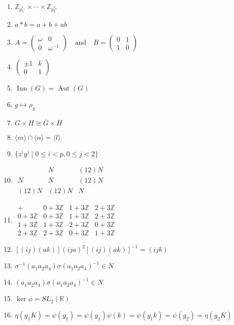 \documentclass[oneside,10pt,]{article}
\newcommand{\inn}{\operatorname{Inn}}
\newcommand{\aut}{\operatorname{Aut}}
\newcommand{\lt}{<}
\begin{document}
\begin{enumerate}
\item{}\({\mathbb Z}_{p_1^{e_1}} \times \cdots \times {\mathbb Z}_{p_k^{e_k}}\)%
\item{}\(a \ast b = a + b + ab\)%
\item{}\(A = \begin{pmatrix} \omega & 0 \\ 0 & \omega^{-1} \end{pmatrix} \quad \text{and} \quad B = \begin{pmatrix} 0 & 1 \\ 1 & 0 \end{pmatrix}\)%
\item{}\(\begin{pmatrix} \pm 1 & k \\ 0 & 1 \end{pmatrix}\)%
\item{}\(\inn(G) = \aut(G)\)%
\item{}\(g \mapsto \rho_g\)%
\item{}\(G \times H \cong \overline{G} \times \overline{H}\)%
\item{}\(\langle m \rangle \cap \langle n \rangle = \langle l \rangle\)%
\item{}\(\{z^iy^j\mid 0\leq i \lt p, 0\leq j \lt 2\}\)%
\item{}\(\begin{array}{c|cc} & N & (12) N \\ \hline N & N & (12) N \\ (12) N & (12) N & N \end{array}\)%
\item{}\(\begin{array}{c|ccc} + & 0 + 3{\mathbb Z} & 1 + 3{\mathbb Z} & 2 + 3{\mathbb Z} \\\hline 0 + 3{\mathbb Z} & 0 + 3{\mathbb Z} & 1 + 3{\mathbb Z} & 2 + 3{\mathbb Z} \\ 1 + 3{\mathbb Z} & 1 + 3{\mathbb Z} & 2 + 3{\mathbb Z} & 0 + 3{\mathbb Z} \\ 2 + 3{\mathbb Z} & 2 + 3{\mathbb Z} & 0 + 3{\mathbb Z} & 1 + 3{\mathbb Z} \end{array}\)%
\item{}\([(i j)(a k)](i j a)^2 [(i j)(a k)]^{-1} = (i j k)\)%
\item{}\(\sigma^{-1}(a_1 a_2 a_4)\sigma(a_1 a_2 a_4)^{-1} \in N\)%
\item{}\((a_1 a_2 a_4)\sigma(a_1 a_2 a_4)^{-1} \in N\)%
\item{}\(\ker \phi = SL_2( {\mathbb R })\)%
\item{}\(\eta(g_1 K) = \psi(g_1) = \psi(g_1) \psi(k) = \psi(g_1k) = \psi(g_2) = \eta(g_2 K)\)%

\end{enumerate}
\end{document}
